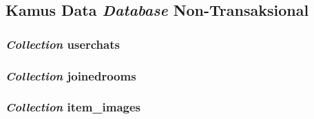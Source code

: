 
\subsection{Kamus Data \textit{Database} Non-Transaksional}
	
	\subsubsection{\textit{Collection} userchats}
	
	\subsubsection{\textit{Collection} joinedrooms}
	\subsubsection{\textit{Collection} item\_images}
	

%   	
    